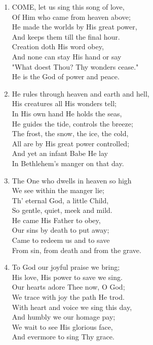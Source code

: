 \documentclass[11pt,a4paper]{article}
\begin{document}
\begin{enumerate}
    \item COME, let us sing this song of love, \\
        Of Him who came from heaven above; \\
        He made the worlds by His great power, \\
        And keeps them till the final hour. \\
        Creation doth His word obey, \\
        And none can stay His hand or say \\
        "What doest Thou? Thy wonders cease." \\
        He is the God of power and peace.

    \item He rules through heaven and earth and hell, \\
        His creatures all His wonders tell; \\
        In His own hand He holds the seas, \\
        He guides the tide, controls the breeze; \\
        The frost, the snow, the ice, the cold, \\
        All are by His great power controlled; \\
        And yet an infant Babe He lay \\
        In Bethlehem's manger on that day.

    \item The One who dwells in heaven so high \\
        We see within the manger lie; \\
        Th' eternal God, a little Child, \\
        So gentle, quiet, meek and mild. \\
        He came His Father to obey, \\
        Our sins by death to put away; \\
        Came to redeem us and to save \\
        From sin, from death and from the grave.

    \item To God our joyful praise we bring; \\
        His love, His power to save we sing. \\
        Our hearts adore Thee now, O God; \\
        We trace with joy the path He trod. \\
        With heart and voice we sing this day, \\
        And humbly we our homage pay; \\
        We wait to see His glorious face, \\
        And evermore to sing Thy grace.

\end{enumerate}
\end{document}
